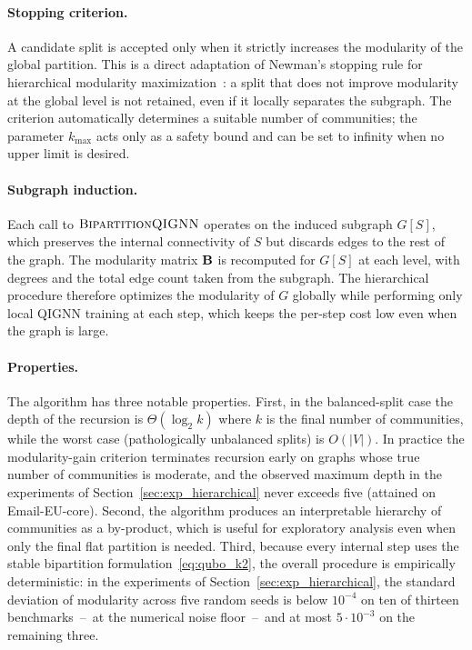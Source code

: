 \paragraph{Stopping criterion.}
A candidate split is accepted only when it strictly increases the
modularity of the global partition. This is a direct adaptation of
Newman's stopping rule for hierarchical modularity
maximization~\cite{newman2006modularity}: a split that does not
improve modularity at the global level is not retained, even if it
locally separates the subgraph. The criterion automatically
determines a suitable number of communities; the parameter
$k_{\max}$ acts only as a safety bound and can be set to infinity
when no upper limit is desired.

\paragraph{Subgraph induction.}
Each call to $\textsc{BipartitionQIGNN}$ operates on the induced
subgraph $G[S]$, which preserves the internal connectivity of $S$
but discards edges to the rest of the graph. The modularity matrix
$\mathbf{B}$ is recomputed for $G[S]$ at each level, with degrees and the
total edge count taken from the subgraph. The hierarchical
procedure therefore optimizes the modularity of $G$ globally while
performing only local QIGNN training at each step, which keeps
the per-step cost low even when the graph is large.

\paragraph{Properties.}
The algorithm has three notable properties. First, in the
balanced-split case the depth of the recursion is
$\Theta(\log_2 k)$ where $k$ is the final number of communities,
while the worst case (pathologically unbalanced splits) is
$O(|V|)$. In practice the modularity-gain criterion terminates
recursion early on graphs whose true number of communities is
moderate, and the observed maximum depth in the experiments of
Section~\ref{sec:exp_hierarchical} never exceeds five (attained
on Email-EU-core). Second, the algorithm produces an interpretable
hierarchy of communities as a by-product, which is useful for
exploratory analysis even when only the final flat partition is
needed. Third, because every internal step uses the stable
bipartition formulation~\eqref{eq:qubo_k2}, the overall
procedure is empirically deterministic: in the experiments of
Section~\ref{sec:exp_hierarchical}, the standard deviation of
modularity across five random seeds is below $10^{-4}$ on ten of
thirteen benchmarks~--~at the numerical noise floor~--~and at
most $5\cdot10^{-3}$ on the remaining three.

\newpage
